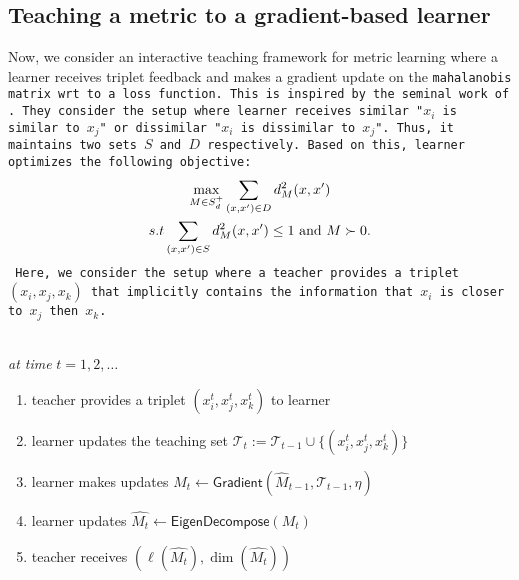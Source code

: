 \subsection{Teaching a metric to a gradient-based learner}

Now, we consider an interactive teaching framework for metric learning where a learner receives triplet feedback and makes a gradient update on the \tt{mahalanobis} matrix wrt to a loss function. This is inspired by the seminal work of \cite{Xing2002DistanceML}. They consider the setup where learner receives \tt{similar} "$x_i$ is similar to $x_j$" or \tt{dissimilar} "$x_i$ is dissimilar to $x_j$". Thus, it maintains two sets $S$ and $D$ respectively. Based on this, learner optimizes the following objective:
\begin{gather*}
    \max_{M \in S_d^{+}} \sum_{(x,x') \in D} d^2_M(x,x')\\
    s.t \sum_{(x,x') \in S} d^2_M(x,x') \le 1 \textnormal{ and } M \succ 0.
\end{gather*}
Here, we consider the setup where a teacher provides a triplet $(x_i,x_j,x_k)$ that implicitly contains the information that $x_i$ is closer to $x_j$ then $x_k$.
\begin{shaded}
\noindent \\
\noindent\textit{at time} $t = 1,2,\ldots$
\begin{enumerate}
    \item teacher provides a triplet $(x_i^t,x_j^t,x_k^t)$ to learner
    \item learner updates the teaching set $\mathcal{T}_t := \mathcal{T}_{t-1} \cup \{(x_i^t,x_j^t,x_k^t)\}$
    \item  learner makes updates $M_t \leftarrow \textsf{Gradient}(\hat{M}_{t-1}, \mathcal{T}_{t-1}, \eta)$ 
    \item learner updates $\hat{M_t} \leftarrow \textsf{EigenDecompose}(M_t)$
    \item teacher receives $(\ell(\hat{M_t}), \dim(\hat{M_t}))$
    
\end{enumerate}
\end{shaded}

